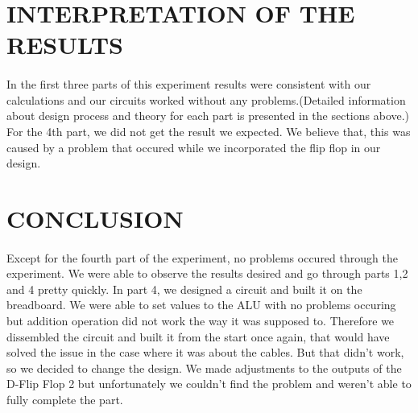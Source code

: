 \documentclass[pdftex,12pt,a4paper]{article}
\begin{document}
\newpage
\section{INTERPRETATION OF THE RESULTS}
\begin{flushleft}

\paragraph{}
In the first three parts of this experiment results were consistent with our calculations and our circuits worked without any problems.(Detailed information about design process and theory for each part is presented in the sections above.) For the 4th part, we did not get the result we expected. We believe that, this was caused by a problem that occured while we incorporated the flip flop in our design. 
\end{flushleft}
\section{CONCLUSION}
\begin{flushleft}

\paragraph{}
Except for the fourth part of the experiment, no problems occured through the experiment. We were able to observe the results desired and go through parts 1,2 and 4 pretty quickly. In part 4, we designed a circuit and built it on the breadboard. We were able to set values to the ALU with no problems occuring but addition operation did not work the way it was supposed to. Therefore we dissembled the circuit and built it from the start once again, that would have solved the issue in the case where it was about the cables. But that didn't work, so we decided to change the design. We made adjustments to the outputs of the D-Flip Flop 2 but unfortunately we couldn't find the problem and weren't able to fully complete the part.
\end{flushleft}
\newpage
{}



\end{document}
